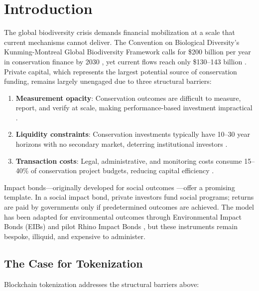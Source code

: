 \section{Introduction}

\label{sec:introduction}

The global biodiversity crisis demands financial mobilization at a scale
that current mechanisms cannot deliver. The Convention on Biological
Diversity's Kunming-Montreal Global Biodiversity Framework calls for
\$200 billion per year in conservation finance by 2030
\citep{cbd2022kunming}, yet current flows reach only \$130--143 billion
\citep{paulson2020financing}. Private capital, which represents the
largest potential source of conservation funding, remains largely
unengaged due to three structural barriers:

\begin{enumerate}[label=(\roman*)]
  \item \textbf{Measurement opacity}: Conservation outcomes are
    difficult to measure, report, and verify at scale, making
    performance-based investment impractical \citep{zu2022biodiversity}.
  \item \textbf{Liquidity constraints}: Conservation investments
    typically have 10--30 year horizons with no secondary market,
    deterring institutional investors \citep{huwyler2014making}.
  \item \textbf{Transaction costs}: Legal, administrative, and
    monitoring costs consume 15--40\% of conservation project budgets,
    reducing capital efficiency \citep{deutz2020financing}.
\end{enumerate}

Impact bonds---originally developed for social outcomes
\citep{liebman2011social}---offer a promising template. In a social
impact bond, private investors fund social programs; returns are paid by
governments only if predetermined outcomes are achieved. The model has
been adapted for environmental outcomes through Environmental Impact
Bonds (EIBs) \citep{nicola2013quantifying} and pilot Rhino Impact Bonds
\citep{uct2020rhino}, but these instruments remain bespoke, illiquid,
and expensive to administer.

\subsection{The Case for Tokenization}

Blockchain tokenization addresses the structural barriers above:

